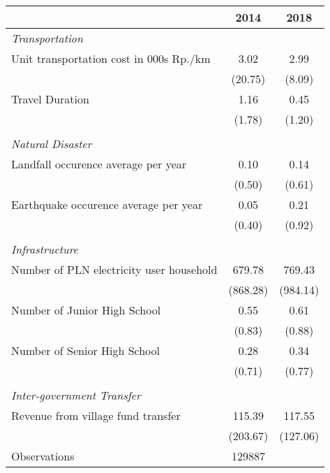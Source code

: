\begin{tabular}{l*{2}{c}}
\hline\hline
                    &        2014&        2018\\
\hline
\emph{Transportation}&            &            \\
\hspace{0.25cm} Unit transportation cost in 000s Rp./km&        3.02&        2.99\\
                    &     (20.75)&      (8.09)\\
\hspace{0.25cm} Travel Duration&        1.16&        0.45\\
                    &      (1.78)&      (1.20)\\
\vspace{0.05em} \\ \emph{Natural Disaster}&            &            \\
\hspace{0.25cm} Landfall occurence average per year&        0.10&        0.14\\
                    &      (0.50)&      (0.61)\\
\hspace{0.25cm} Earthquake occurence average per year&        0.05&        0.21\\
                    &      (0.40)&      (0.92)\\
\vspace{0.05em} \\ \emph{Infrastructure}&            &            \\
\hspace{0.25cm} Number of PLN electricity user household&      679.78&      769.43\\
                    &    (868.28)&    (984.14)\\
\hspace{0.25cm} Number of Junior High School&        0.55&        0.61\\
                    &      (0.83)&      (0.88)\\
\hspace{0.25cm} Number of Senior High School&        0.28&        0.34\\
                    &      (0.71)&      (0.77)\\
\vspace{0.05em} \\ \emph{Inter-government Transfer}&            &            \\
\hspace{0.25cm} Revenue from village fund transfer&      115.39&      117.55\\
                    &    (203.67)&    (127.06)\\
\hline
Observations        &      129887&            \\
\hline\hline
\end{tabular}
